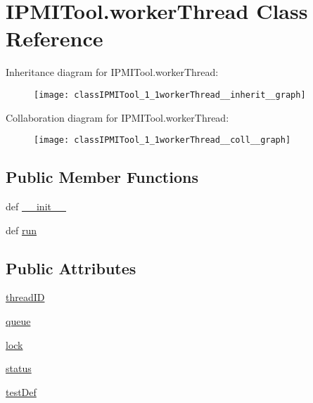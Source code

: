 \hypertarget{classIPMITool_1_1workerThread}{\section{I\-P\-M\-I\-Tool.\-worker\-Thread Class Reference}
\label{classIPMITool_1_1workerThread}
}


Inheritance diagram for I\-P\-M\-I\-Tool.\-worker\-Thread\-:\nopagebreak
\begin{figure}[H]
\begin{center}
\leavevmode
\texttt{[image: classIPMITool\_1\_1workerThread\_\_inherit\_\_graph]}
\end{center}
\end{figure}


Collaboration diagram for I\-P\-M\-I\-Tool.\-worker\-Thread\-:\nopagebreak
\begin{figure}[H]
\begin{center}
\leavevmode
\texttt{[image: classIPMITool\_1\_1workerThread\_\_coll\_\_graph]}
\end{center}
\end{figure}
\subsection*{Public Member Functions}
\begin{DoxyCompactItemize}
\item 
def \hyperlink{classIPMITool_1_1workerThread_ae99fbfedf34b12d752aff36969fdb346}{\-\_\-\-\_\-init\-\_\-\-\_\-}
\item 
def \hyperlink{classIPMITool_1_1workerThread_a8584ed7e68afe66df337c3619ad4d1a4}{run}
\end{DoxyCompactItemize}
\subsection*{Public Attributes}
\begin{DoxyCompactItemize}
\item 
\hyperlink{classIPMITool_1_1workerThread_ad9622aa9a06ed124fa430c7f57335335}{thread\-I\-D}
\item 
\hyperlink{classIPMITool_1_1workerThread_a023c5663badff1010199d1494c8b3639}{queue}
\item 
\hyperlink{classIPMITool_1_1workerThread_a0c20d3839986d29dff2783bf4bc8920a}{lock}
\item 
\hyperlink{classIPMITool_1_1workerThread_a611bfcde0fa8d328904fde134bde0d87}{status}
\item 
\hyperlink{classIPMITool_1_1workerThread_a83638bfbceb196edbfd06990e230cd8e}{test\-Def}
\end{DoxyCompactItemize}


